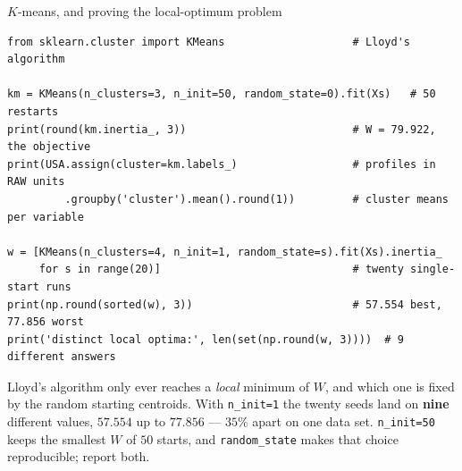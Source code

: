 \documentclass[aspectratio=169,11pt]{beamer}
\begin{document}
\begin{frame}[fragile]{$K$-means, and proving the local-optimum problem}
  \begin{lstlisting}
from sklearn.cluster import KMeans                    # Lloyd's algorithm

km = KMeans(n_clusters=3, n_init=50, random_state=0).fit(Xs)   # 50 restarts
print(round(km.inertia_, 3))                          # W = 79.922, the objective
print(USA.assign(cluster=km.labels_)                  # profiles in RAW units
         .groupby('cluster').mean().round(1))         # cluster means per variable

w = [KMeans(n_clusters=4, n_init=1, random_state=s).fit(Xs).inertia_
     for s in range(20)]                              # twenty single-start runs
print(np.round(sorted(w), 3))                         # 57.554 best, 77.856 worst
print('distinct local optima:', len(set(np.round(w, 3))))  # 9 different answers
  \end{lstlisting}
  \footnotesize
  \begin{readme}
    Lloyd's algorithm only ever reaches a \emph{local} minimum of $W$, and which one is
    fixed by the random starting centroids. With \texttt{n\_init=1} the twenty seeds land
    on \textbf{nine} different values, $57.554$ up to $77.856$ --- $35\%$ apart on one data
    set. \texttt{n\_init=50} keeps the smallest $W$ of $50$ starts, and
    \texttt{random\_state} makes that choice reproducible; report both.
  \end{readme}
\end{frame}
\end{document}
